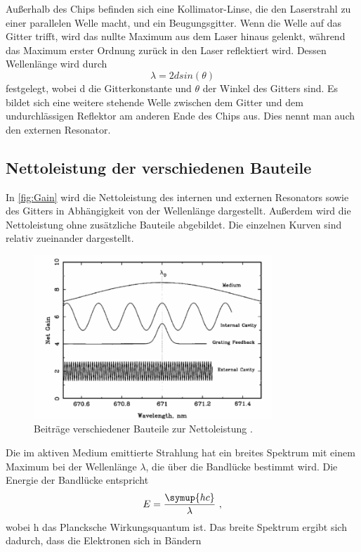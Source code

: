 Außerhalb des Chips befinden sich eine Kollimator-Linse, die den Laserstrahl zu einer 
parallelen Welle macht, und ein Beugungsgitter. Wenn die Welle auf das Gitter trifft, wird 
das nullte Maximum aus dem Laser hinaus gelenkt, während das Maximum erster Ordnung zurück in den 
Laser reflektiert wird. Dessen Wellenlänge wird durch 
\begin{equation*}
    \lambda = 2dsin(\theta)
\end{equation*}
festgelegt, wobei d die Gitterkonstante und $\theta$ der Winkel des Gitters sind. Es bildet sich 
eine weitere stehende Welle zwischen dem Gitter und dem undurchlässigen Reflektor am anderen Ende des 
Chips aus. Dies nennt man auch den externen Resonator.

\subsection{Nettoleistung der verschiedenen Bauteile}
In \autoref{fig:Gain} wird die Nettoleistung des internen und externen Resonators sowie des Gitters in Abhängigkeit von der Wellenlänge dargestellt. 
Außerdem wird die Nettoleistung ohne zusätzliche Bauteile abgebildet. Die einzelnen Kurven sind relativ zueinander dargestellt.
\begin{figure}
    \centering
    \includegraphics[width=0.8\textwidth]{NetGain.png}
    \caption{Beiträge verschiedener Bauteile zur Nettoleistung \cite{ap60}.}
    \label{fig:Gain}
\end{figure}
Die im aktiven Medium emittierte Strahlung hat ein breites Spektrum mit einem Maximum bei der Wellenlänge 
$\lambda$, die über die Bandlücke bestimmt wird. Die Energie der Bandlücke entspricht 
\begin{equation*}
    E = \frac{\symup{hc}}{\lambda} \, \, ,
\end{equation*}
wobei h das Plancksche Wirkungsquantum ist. Das breite Spektrum ergibt sich dadurch, dass die Elektronen sich in Bändern
